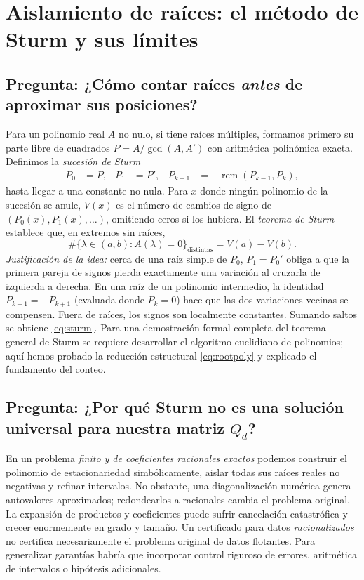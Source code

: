 \documentclass[11pt,letterpaper,parskip=half,headings=small]{scrartcl}
\theoremstyle{definition}\newtheorem{definicion}[proposicion]{Definición}
\theoremstyle{remark}\newtheorem{observacion}[proposicion]{Observación}
\newcommand{\pregunta}[1]{\subsection{Pregunta: #1}}
\begin{document}
\section{Aislamiento de raíces: el método de Sturm y sus límites}
\pregunta{¿Cómo contar raíces \emph{antes} de aproximar sus posiciones?}
Para un polinomio real $A$ no nulo, si tiene raíces múltiples,
formamos primero su parte libre de cuadrados
$P=A/\gcd(A,A')$ con aritmética polinómica exacta. Definimos la
\emph{sucesión de Sturm}
\begin{align*}
P_0&=P,&P_1&=P',&P_{k+1}&=-\operatorname{rem}(P_{k-1},P_k),
\end{align*}
hasta llegar a una constante no nula. Para $x$ donde ningún polinomio
de la sucesión se anule, $V(x)$ es el número de cambios de signo de
$(P_0(x),P_1(x),\ldots)$, omitiendo ceros si los hubiera.
El \emph{teorema de Sturm} establece que, en extremos sin raíces,
\begin{equation}\label{eq:sturm}
\boxed{\#\{\lambda\in(a,b):A(\lambda)=0\}_{\mathrm{distintas}}
=V(a)-V(b).}
\end{equation}
\emph{Justificación de la idea:} cerca de una raíz simple de $P_0$,
$P_1=P_0'$ obliga a que la primera pareja de signos pierda exactamente
una variación al cruzarla de izquierda a derecha. En una raíz de
un polinomio intermedio, la identidad
$P_{k-1}=-P_{k+1}$ (evaluada donde $P_k=0$) hace que las dos
variaciones vecinas se compensen. Fuera de raíces, los signos son
localmente constantes. Sumando saltos se obtiene
\eqref{eq:sturm}. Para una demostración formal completa del teorema
general de Sturm se requiere desarrollar el algoritmo euclidiano
de polinomios; aquí hemos probado la reducción estructural
\eqref{eq:rootpoly} y explicado el fundamento del conteo.

\pregunta{¿Por qué Sturm no es una solución universal para nuestra matriz $Q_d$?}
En un problema \emph{finito y de coeficientes racionales exactos}
podemos construir el polinomio de estacionariedad simbólicamente,
aislar todas sus raíces reales no negativas y refinar intervalos.
No obstante, una diagonalización numérica genera autovalores
aproximados; redondearlos a racionales cambia el problema original.
La expansión de productos y coeficientes puede sufrir cancelación
catastrófica y crecer enormemente en grado y tamaño.
Un certificado para datos \emph{racionalizados} no certifica
necesariamente el problema original de datos flotantes.
Para generalizar garantías habría que incorporar control riguroso
de errores, aritmética de intervalos o hipótesis adicionales.
\end{document}
